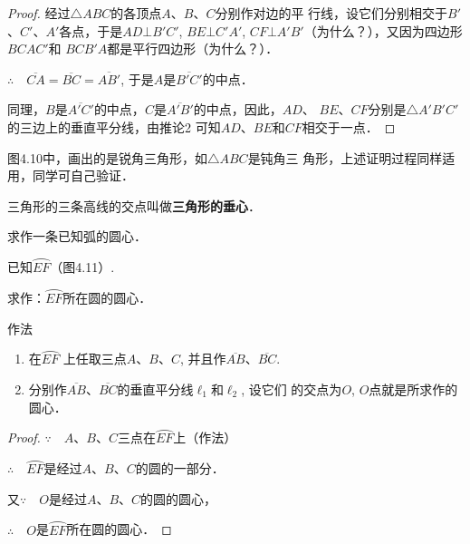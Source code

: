 \begin{proof}
    经过$\triangle ABC$的各顶点$A$、$B$、$C$分别作对边的平
行线，设它们分别相交于$B'$、$C'$、$A'$各点，于是$AD\bot B'C'$,
$BE\bot C'A'$, $CF\bot A'B'$（为什么？），又因为四边形$BCAC'$和
$BCB'A$都是平行四边形（为什么？）．

$\therefore\quad \overline{CA}=\overline{BC}=\overline{AB'}$, 于是$A$是$\overline{B'C'}$的中点．

同理，$B$是$\overline{A'C'}$的中点，$C$是$\overline{A'B'}$的中点，因此，$AD$、
$BE$、$CF$分别是$\triangle A'B'C'$的三边上的垂直平分线，由推论2
可知$AD$、$BE$和$CF$相交于一点．
\end{proof}


图4.10中，画出的是锐角三角形，如$\triangle ABC$是钝角三
角形，上述证明过程同样适用，同学可自己验证．

三角形的三条高线的交点叫做\textbf{三角形的垂心}．

\begin{example}
    求作一条已知弧的圆心．
\end{example}

已知$\wideparen{EF}$（图4.11）.

求作：$\wideparen{EF}$所在圆的圆心．

作法
\begin{enumerate}
    \item 在$\wideparen{EF}$
    上任取三点$A$、$B$、$C$, 并且作$\overline{AB}$、$\overline{BC}$.
    \item 分别作$\overline{AB}$、$\overline{BC}$的垂直平分线$\ell_1$和$\ell_2$, 设它们
    的交点为$O$, $O$点就是所求作的圆心．
\end{enumerate}

\begin{proof}
    $\because\quad A$、$B$、$C$三点在$\wideparen{EF}$上（作法）

$\therefore\quad \wideparen{EF}$是经过$A$、$B$、$C$的圆的一部分．

又$\because\quad O$是经过$A$、$B$、$C$的圆的圆心，

$\therefore\quad O$是$\wideparen{EF}$所在圆的圆心．
\end{proof}

